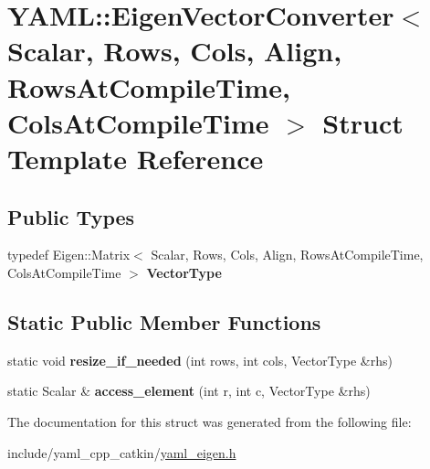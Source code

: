 \hypertarget{structYAML_1_1EigenVectorConverter}{}\section{Y\+A\+ML\+:\+:Eigen\+Vector\+Converter$<$ Scalar, Rows, Cols, Align, Rows\+At\+Compile\+Time, Cols\+At\+Compile\+Time $>$ Struct Template Reference}
\label{structYAML_1_1EigenVectorConverter}
\subsection*{Public Types}
\begin{DoxyCompactItemize}
\item 
\mbox{\label{structYAML_1_1EigenVectorConverter_afa182cb98f58630ff1ed5548a961474e}} 
typedef Eigen\+::\+Matrix$<$ Scalar, Rows, Cols, Align, Rows\+At\+Compile\+Time, Cols\+At\+Compile\+Time $>$ {\bfseries Vector\+Type}
\end{DoxyCompactItemize}
\subsection*{Static Public Member Functions}
\begin{DoxyCompactItemize}
\item 
\mbox{\label{structYAML_1_1EigenVectorConverter_a7a791e9412c2386c59b33794d7bd339a}} 
static void {\bfseries resize\+\_\+if\+\_\+needed} (int rows, int cols, Vector\+Type \&rhs)
\item 
\mbox{\label{structYAML_1_1EigenVectorConverter_a6d52c444a505118006dc1e721da15fad}} 
static Scalar \& {\bfseries access\+\_\+element} (int r, int c, Vector\+Type \&rhs)
\end{DoxyCompactItemize}


The documentation for this struct was generated from the following file\+:\begin{DoxyCompactItemize}
\item 
include/yaml\+\_\+cpp\+\_\+catkin/\hyperlink{yaml__eigen_8h}{yaml\+\_\+eigen.\+h}\end{DoxyCompactItemize}
